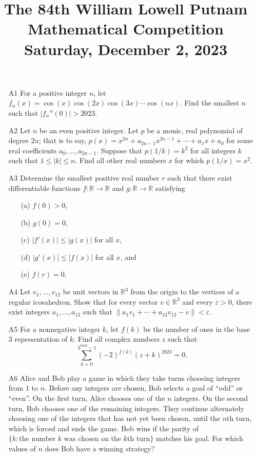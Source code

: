 \documentclass[amssymb,twocolumn,pra,10pt,aps,nofootinbib]{revtex4-1}
\begin{document}
\title{The 84th William Lowell Putnam Mathematical Competition \\
    Saturday, December 2, 2023}
\maketitle

\begin{itemize}

\item[A1]
For a positive integer $n$, let $f_n(x) = \cos(x) \cos(2x) \cos(3x) \cdots \cos(nx)$. Find the smallest $n$ such that $|f_n''(0)| > 2023$.

\item[A2]
Let $n$ be an even positive integer. Let $p$ be a monic, real polynomial of degree $2n$; that is to say, $p(x) = x^{2n} + a_{2n-1} x^{2n-1} + \cdots + a_1 x + a_0$ for some real coefficients $a_0, \dots, a_{2n-1}$. Suppose that $p(1/k) = k^2$ for all integers $k$ such that $1 \leq |k| \leq n$. Find all other real numbers $x$ for which $p(1/x) = x^2$.

\item[A3]
Determine the smallest positive real number $r$ such that there exist differentiable functions $f\colon \mathbb{R} \to \mathbb{R}$ and
$g\colon \mathbb{R} \to \mathbb{R}$ satisfying
\begin{enumerate}
\item[(a)] $f(0) > 0$,
\item[(b)] $g(0) = 0$,
\item[(c)] $|f'(x)| \leq |g(x)|$ for all $x$,
\item[(d)] $|g'(x)| \leq |f(x)|$ for all $x$, and
\item[(e)] $f(r) = 0$.
\end{enumerate}

\item[A4]
Let $v_1, \dots, v_{12}$ be unit vectors in $\mathbb{R}^3$ from the origin to the vertices of a regular icosahedron. Show that for every vector $v \in \mathbb{R}^3$ and every $\varepsilon > 0$, there exist integers $a_1,\dots,a_{12}$ such that $\| a_1 v_1 + \cdots + a_{12} v_{12} - v \| < \varepsilon$.
 
\item[A5]
For a nonnegative integer $k$, let $f(k)$ be the number of ones in the base 3 representation of $k$. Find all complex numbers $z$ such that
\[
\sum_{k=0}^{3^{1010}-1} (-2)^{f(k)} (z+k)^{2023} = 0.
\]

\item[A6]
Alice and Bob play a game in which they take turns choosing integers from $1$ to $n$. Before any integers are chosen, Bob selects a goal of ``odd'' or ``even''. On the first turn, Alice chooses one of the $n$ integers. On the second turn, Bob chooses one of the remaining integers. They continue alternately choosing one of the integers that has not yet been chosen, until the $n$th turn, which is forced and ends the game. Bob wins if the parity of $\{k\colon \mbox{the number $k$ was chosen on the $k$th turn}\}$ matches his goal. For which values of $n$ does Bob have a winning strategy?


\end{itemize}
\end{document}

